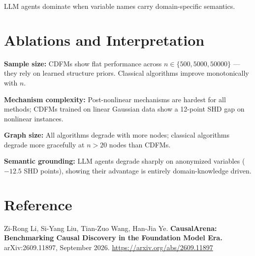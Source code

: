 \documentclass[10pt,twocolumn]{article}
\begin{document}
LLM agents dominate when variable names carry domain-specific semantics.

\section{Ablations and Interpretation}

\textbf{Sample size:} CDFMs show flat performance across
$n \in \{500, 5000, 50000\}$ --- they rely on learned structure priors.
Classical algorithms improve monotonically with $n$.

\textbf{Mechanism complexity:} Post-nonlinear mechanisms are hardest
for all methods; CDFMs trained on linear Gaussian data show a
12-point SHD gap on nonlinear instances.

\textbf{Graph size:} All algorithms degrade with more nodes; classical
algorithms degrade more gracefully at $n > 20$ nodes than CDFMs.

\textbf{Semantic grounding:} LLM agents degrade sharply on anonymized
variables ($-12.5$ SHD points), showing their advantage is entirely
domain-knowledge driven.

\section*{Reference}

Zi-Rong Li, Si-Yang Liu, Tian-Zuo Wang, Han-Jia Ye.
\textbf{CausalArena: Benchmarking Causal Discovery in the Foundation
Model Era.} arXiv:2609.11897, September 2026.
\url{https://arxiv.org/abs/2609.11897}
\end{document}
